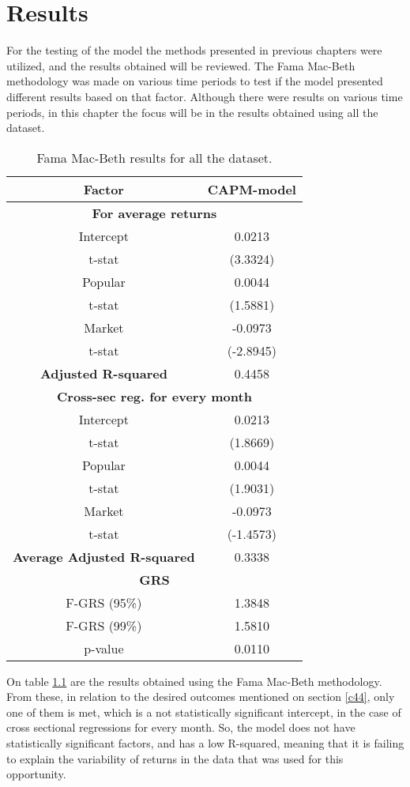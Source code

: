 \chapter{Results}
\label{c5}
For the testing of the model the methods presented in previous chapters were utilized, and the results obtained will be reviewed. The Fama Mac-Beth methodology was made on various time periods to test if the model presented different results based on that factor. Although there were results on various time periods, in this chapter the focus will be in the results obtained using all the dataset.
\begin{table}[h!]
	\centering
	\captionsetup{skip=0.5\baselineskip}
	\caption{Fama Mac-Beth results for all the dataset.}
	\begin{tabular}{|c|c|}
		\hline
		\textbf{Factor} & \textbf{CAPM-model} \\ \hline
		\multicolumn{2}{|c|}{\textbf{For average returns}} \\ \hline
		Intercept & 0.0213 \\ 
		t-stat & (3.3324) \\ \hline
		Popular & 0.0044 \\ 
		t-stat & (1.5881)\\ \hline
		Market & -0.0973 \\
		t-stat & (-2.8945)\\ \hline
		\textbf{Adjusted R-squared} & 0.4458 \\ \hline
		\multicolumn{2}{|c|}{\textbf{Cross-sec reg. for every month}} \\ \hline
		Intercept & 0.0213 \\ 
		t-stat & (1.8669) \\ \hline
		Popular & 0.0044 \\ 
		t-stat & (1.9031)\\ \hline
		Market & -0.0973 \\
		t-stat & (-1.4573)\\ \hline
		\textbf{Average Adjusted R-squared} & 0.3338 \\ \hline
		\multicolumn{2}{|c|}{\textbf{GRS}} \\ \hline
		F-GRS (95\%) & 1.3848 \\ \hline
		F-GRS (99\%) & 1.5810 \\ \hline
		p-value & 0.0110 \\ \hline
	\end{tabular}
	\label{table: Results-all-data}
\end{table}

On table \ref{table: Results-all-data} are the results obtained using the Fama Mac-Beth methodology. From these, in relation to the desired outcomes mentioned on section \ref{c44}, only one of them is met, which is a not statistically significant intercept, in the case of cross sectional regressions for every month. So, the model does not have statistically significant factors, and has a low R-squared, meaning that it is failing to explain the variability of returns in the data that was used for this opportunity.

